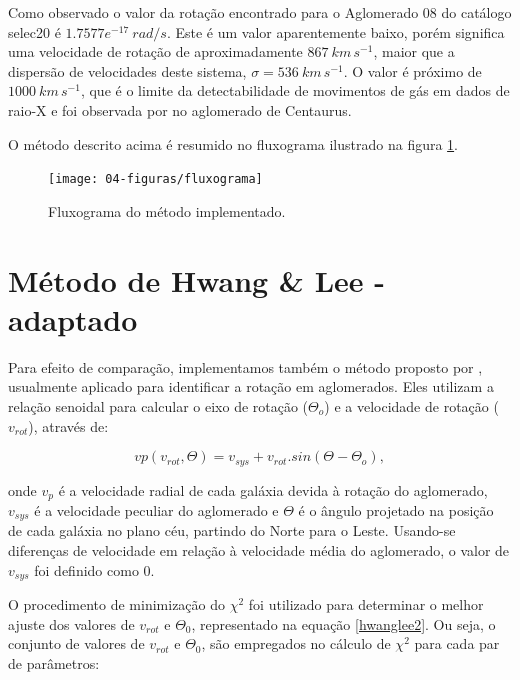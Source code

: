 Como observado o valor da rotação encontrado para o Aglomerado 08 do catálogo selec20 é $1.7577e^{-17}~rad/s$. Este é um valor aparentemente baixo, porém significa uma velocidade de rotação de aproximadamente $867 ~km \, s^{-1}$, maior que a dispersão de velocidades deste sistema,
$\sigma = 536~km \, s^{-1}$. O valor é próximo  de $1000 ~km \, s^{-1}$, que é o limite da detectabilidade de movimentos de gás em dados de raio-X e foi observada por  no aglomerado de Centaurus. 

O método descrito acima é resumido no fluxograma ilustrado na figura \ref{fluxograma}.

\begin{figure}[H] %
\vspace{-2pt}
\begin{center}
\texttt{[image: 04-figuras/fluxograma]}%
\caption{Fluxograma do método implementado.}
\label{fluxograma}%
\end{center}
\end{figure}

\section{Método de Hwang \& Lee - adaptado}

Para efeito de comparação, implementamos também o 
método proposto por , usualmente aplicado para identificar a rotação em aglomerados. Eles utilizam a relação senoidal para calcular o eixo de rotação ($\Theta_o$) e a velocidade de rotação ($v_{rot}$), através de:

\begin{equation}
 vp(v_{rot}, \Theta) = v_{sys} + v_{rot} . sin(\Theta - \Theta_o) ,
 \label{eq:hwanglee1}
\end{equation}

\noindent onde $v_p$ é a velocidade radial de cada galáxia devida à rotação do aglomerado, $v_{sys}$ é a velocidade peculiar do aglomerado e $\Theta$ é o ângulo projetado na posição de cada galáxia no plano céu, partindo do Norte para o Leste. Usando-se diferenças de velocidade em relação à velocidade média do aglomerado, o valor de $v_{sys}$ foi definido como 0.

O procedimento de minimização do $\chi^2$ foi utilizado para determinar o melhor ajuste dos valores de $v_{rot}$ e $\Theta_0$, representado na equação \ref{hwanglee2}. Ou seja, o conjunto de valores de $v_{rot}$ e $\Theta_0$, são empregados no cálculo de $\chi^2$ para cada par de parâmetros:

